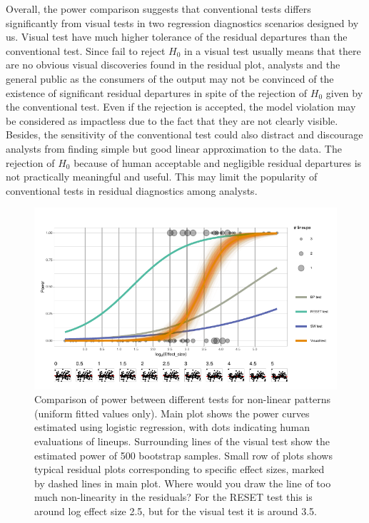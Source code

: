 \documentclass[]{interact}
\theoremstyle{plain}%
\theoremstyle{definition}
\theoremstyle{remark}
\begin{document}
Overall, the power comparison suggests that conventional tests differs
significantly from visual tests in two regression diagnostics scenarios
designed by us. Visual test have much higher tolerance of the residual
departures than the conventional test. Since fail to reject \(H_0\) in a
visual test usually means that there are no obvious visual discoveries
found in the residual plot, analysts and the general public as the
consumers of the output may not be convinced of the existence of
significant residual departures in spite of the rejection of \(H_0\)
given by the conventional test. Even if the rejection is accepted, the
model violation may be considered as impactless due to the fact that
they are not clearly visible. Besides, the sensitivity of the
conventional test could also distract and discourage analysts from
finding simple but good linear approximation to the data. The rejection
of \(H_0\) because of human acceptable and negligible residual
departures is not practically meaningful and useful. This may limit the
popularity of conventional tests in residual diagnostics among analysts.

\begin{figure}

{\centering \includegraphics[width=1\linewidth]{paper_comparison_files/figure-latex/polypower-1} 

}

\caption{Comparison of power between different tests for non-linear patterns (uniform fitted values only). Main plot shows the power curves estimated using logistic regression, with dots indicating human evaluations of lineups. Surrounding lines of the visual test show the estimated power of 500 bootstrap samples. Small row of plots shows typical residual plots corresponding to specific effect sizes, marked by dashed lines in main plot. Where would you draw the line of too much non-linearity in the residuals? For the RESET test this is around log effect size 2.5, but for the visual test it is around 3.5.}\label{fig:polypower}
\end{figure}
\end{document}
